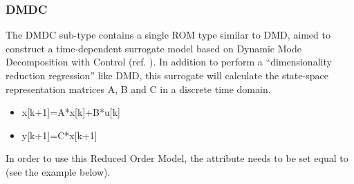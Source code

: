 



\subsubsection{DMDC}
\label{subsubsec:polyexponential}
The DMDC sub-type contains a single ROM type similar to DMD, aimed to construct a time-dependent surrogate model based on Dynamic 
Mode Decomposition with Control (ref. \cite{proctor2016dynamic}).
In addition to perform a ``dimensionality reduction regression'' like DMD, this surrogate will calculate the state-space 
representation matrices A, B and  C in a discrete time domain. 

\begin{itemize}
\item x[k+1]=A*x[k]+B*u[k]
\item y[k+1]=C*x[k+1] 
\end{itemize}

%
In order to use this Reduced Order Model, the  attribute
 needs to be set equal to  (see the example
below).
%
\subnodeIntro

